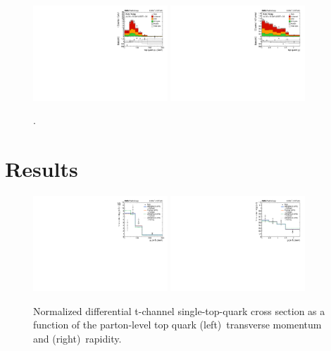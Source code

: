 \documentclass[12pt]{article}
\begin{document}
\begin{figure}[th]
\begin{center}
\includegraphics[width=0.45\textwidth]{figures/unfolding/reco_toppt_bdt.pdf}\hspace{0.05\textwidth}
\includegraphics[width=0.45\textwidth]{figures/unfolding/reco_topy_bdt.pdf}
\end{center}

\caption{.}
\end{figure}

\section{Results}

\begin{figure}[th]
\begin{center}
\includegraphics[width=0.45\textwidth]{figures/result/unfolded_top_pt.pdf}\hspace{0.05\textwidth}
\includegraphics[width=0.45\textwidth]{figures/result/unfolded_top_y.pdf}
\end{center}

\caption{Normalized differential t-channel single-top-quark cross section as a function of the parton-level top quark (left)~transverse momentum and (right)~rapidity.}
\end{figure}
\end{document}

